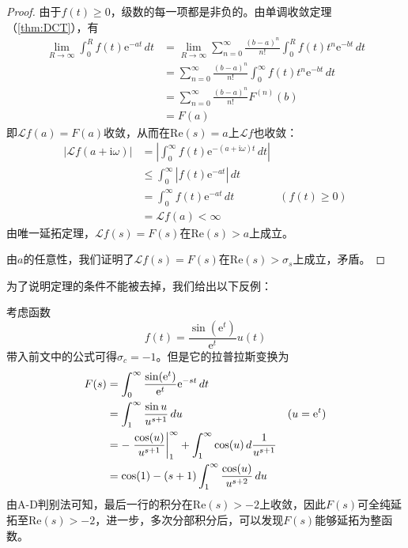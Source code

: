 \begin{proof}
    由于$f(t)\geq 0$，级数的每一项都是非负的。由单调收敛定理（\cref{thm:DCT}），有
    \begin{align*}
        \lim_{R\to\infty}\int_{0}^{R}f(t)\mathrm{e}^{-a t}\,dt&=\lim_{R\to\infty}\sum_{n=0}^{\infty}\frac{(b-a)^n}{n!}\int_{0}^{R}f(t)t^n \mathrm{e}^{-b t}\,dt\\
        &=\sum_{n=0}^{\infty}\frac{(b-a)^n}{n!}\int_{0}^{\infty}f(t)t^n \mathrm{e}^{-b t}\,dt\\
        &=\sum_{n=0}^{\infty}\frac{(b-a)^n}{n!}F^{(n)}(b)\\
        &=F(a)
    \end{align*}
    即$\mathcal{L} f(a)=F(a)$收敛，从而在$\mathrm{Re}(s)=a$上$\mathcal{L} f$也收敛：\begin{align*}
        |\mathcal{L} f(a+\mathrm{i}\omega)|&=\left|\int_{0}^{\infty}f(t)\mathrm{e}^{-(a+\mathrm{i}\omega) t}\,dt\right|\\
        &\leq \int_{0}^{\infty}\left|f(t)\mathrm{e}^{-a t}\right|\,dt\\
        &=\int_{0}^{\infty}f(t)\mathrm{e}^{-a t}\,dt&\left(f(t)\geq 0\right)\\
        &=\mathcal{L}f(a)<\infty
    \end{align*}
    由唯一延拓定理，$\mathcal{L} f(s)=F(s)$在$\mathrm{Re}(s)>a$上成立。

    由$a$的任意性，我们证明了$\mathcal{L} f(s)=F(s)$在$\mathrm{Re}(s)>\sigma_s$上成立，矛盾。
\end{proof}

为了说明定理的条件不能被去掉，我们给出以下反例\cite{Laplace_Transform}：
\begin{example}
    考虑函数
    \[f(t)=\frac{\sin(\mathrm{e}^t)}{\mathrm{e}^t}u(t)\]
    带入前文中的公式可得$\sigma_c=-1$。但是它的拉普拉斯变换为
    \begin{align*}
        F(s)&=\int_{0}^{\infty}\frac{\sin(\mathrm{e}^t)}{\mathrm{e}^t}\mathrm{e}^{-s t}\,dt\\
        &=\int_{1}^{\infty}\frac{\sin u}{u^{s+1}}\,du&(u=\mathrm{e}^t)\\
        &=-\left.\frac{\cos(u)}{u^{s+1}}\right|_{1}^{\infty}+\int_{1}^{\infty}\cos(u)\,d\frac{1}{u^{s+1}}\\
        &=\cos(1)-(s+1)\int_{1}^{\infty}\frac{\cos(u)}{u^{s+2}}\,du
    \end{align*}
    由A-D判别法可知，最后一行的积分在$\mathrm{Re}(s)>-2$上收敛，因此$F(s)$可全纯延拓至$\mathrm{Re}(s)>-2$，进一步，多次分部积分后，可以发现$F(s)$能够延拓为整函数。
\end{example}

